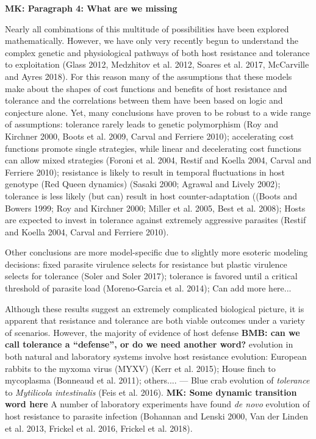 \documentclass{article}
\newcommand{\mk}[1]{{\bf \color{red} MK: #1}}
\newcommand{\bb}[1]{{\bf \color{blue} BMB: #1}}
\begin{document}
\mk{Paragraph 4: What are we missing}

Nearly all combinations of this multitude of possibilities have been explored mathematically. However, we have only very recently begun to understand the complex genetic and physiological pathways of both host resistance and tolerance to exploitation (Glass 2012, Medzhitov et al. 2012, Soares et al. 2017, McCarville and Ayres 2018). For this reason many of the assumptions that these models make about the shapes of cost functions and benefits of host resistance and tolerance and the correlations between them have been based on logic and conjecture alone. Yet, many conclusions have proven to be robust to a wide range of assumptions: tolerance rarely leads to genetic polymorphism (Roy and Kirchner 2000, Boots et al. 2009, Carval and Ferriere 2010); accelerating cost functions promote single strategies, while linear and decelerating cost functions can allow mixed strategies (Foroni et al. 2004, Restif and Koella 2004, Carval and Ferriere 2010); resistance is likely to result in temporal fluctuations in host genotype (Red Queen dynamics) (Sasaki 2000; Agrawal and Lively 2002); tolerance is less likely (but can) result in host counter-adaptation ((Boots and Bowers 1999; Roy and Kirchner 2000; Miller et al. 2005, Best et al. 2008); Hosts are expected to invest in tolerance against extremely aggressive parasites (Restif and Koella 2004, Carval and Ferriere 2010). 

Other conclusions are more model-specific due to slightly more esoteric modeling decisions: fixed parasite virulence selects for resistance but plastic virulence selects for tolerance (Soler and Soler 2017); tolerance is favored until a critical threshold of parasite load (Moreno-Garcia et al. 2014); Can add more here...

Although these results suggest an extremely complicated biological picture, it is apparent that resistance and tolerance are both viable outcomes under a variety of scenarios. However, the majority of evidence of host defense \bb{can we call tolerance a ``defense'', or do we need another word?} evolution in both natural and laboratory systems involve host resistance evolution: European rabbits to the myxoma virus (MYXV) (Kerr et al. 2015); House finch to mycoplasma (Bonneaud et al. 2011); others.... --- Blue crab evolution of \emph{tolerance} to \emph{Mytilicola intestinalis} (Feis et al. 2016). \mk{Some dynamic transition word here} A number of laboratory experiments have found \emph{de novo} evolution of host resistance to parasite infection (Bohannan and Lenski 2000, Van der Linden et al. 2013, Frickel et al. 2016, Frickel et al. 2018).
\end{document}
